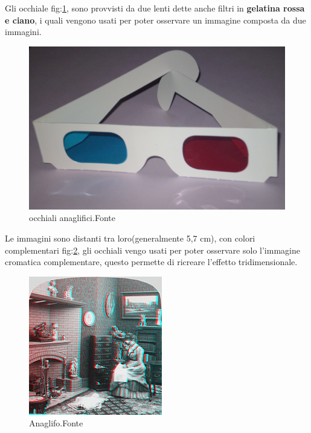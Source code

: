 \documentclass[10pt,a4paper]{article}
\begin{document}
	Gli occhiale fig:\ref{fig:occhiali_anaglifici}, sono provvisti da due lenti dette anche  filtri in \textbf{gelatina rossa e ciano}, i quali vengono usati per poter osservare un immagine composta da due immagini. 
	\begin{figure}[H]
		\centering
		\includegraphics[width=0.7\linewidth]{image/occhiali_anaglifici}
		\caption{occhiali anaglifici.Fonte\cite{Anaglifo_image}}
		\label{fig:occhiali_anaglifici}
	\end{figure}
	Le immagini sono distanti tra loro(generalmente 5,7 cm), con colori complementari fig:\ref{fig:anaglifo}, gli occhiali vengo usati per poter osservare solo l'immagine cromatica complementare, questo permette di ricreare l'effetto tridimensionale.
	 \begin{figure}[H]
	 	\centering
	 	\includegraphics[width=0.7\linewidth]{image/anaglifo}
	 	\caption{Anaglifo.Fonte\cite{Anaglifo_image}}
	 	\label{fig:anaglifo}
	 \end{figure}
 \newpage
\end{document}
